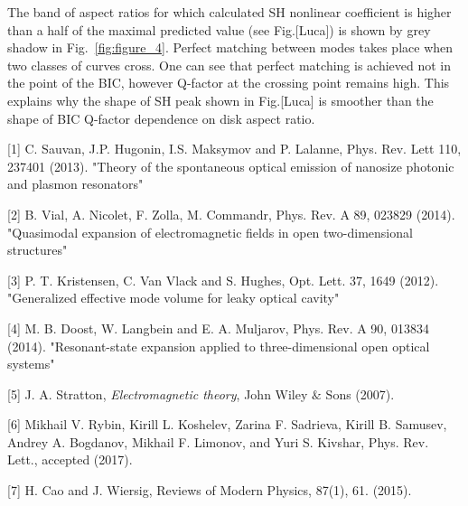 \documentclass[prl,notitlepage,twocolumn]{revtex4}
\begin{document}
The band of aspect ratios for which calculated SH nonlinear coefficient is higher than a half of the maximal predicted value (see Fig.[Luca])  is shown by grey shadow in Fig.~\ref{fig:figure_4}. Perfect matching between modes takes place when two classes of curves cross. One can see that perfect matching is achieved not in the point of the BIC, however Q-factor at the crossing point remains high. This explains why the shape of SH peak shown in Fig.[Luca] is smoother than the shape of BIC Q-factor dependence on disk aspect ratio.






[1] C. Sauvan, J.P. Hugonin, I.S. Maksymov and P. Lalanne, Phys. Rev. Lett 110, 237401 (2013). "Theory of the spontaneous optical emission of nanosize photonic and plasmon resonators"

[2] B. Vial, A. Nicolet, F. Zolla, M. Commandr, Phys. Rev. A 89, 023829 (2014). "Quasimodal expansion of electromagnetic fields in open two-dimensional structures"

[3] P. T. Kristensen, C. Van Vlack and S. Hughes, Opt. Lett. 37, 1649 (2012). "Generalized effective mode volume for leaky optical cavity" 

[4] M. B. Doost, W. Langbein and E. A. Muljarov, Phys. Rev. A 90, 013834 (2014). "Resonant-state expansion applied to three-dimensional open optical systems"

[5] J. A. Stratton, {\it Electromagnetic theory}, John Wiley $\&$ Sons (2007).

[6] Mikhail V. Rybin, Kirill L. Koshelev, Zarina F. Sadrieva, Kirill B. Samusev, Andrey A. Bogdanov, Mikhail F. Limonov, and Yuri S. Kivshar, Phys. Rev. Lett., accepted (2017).

[7] H. Cao and J. Wiersig, Reviews of Modern Physics, 87(1), 61. (2015).


% 
%

\end{document}
